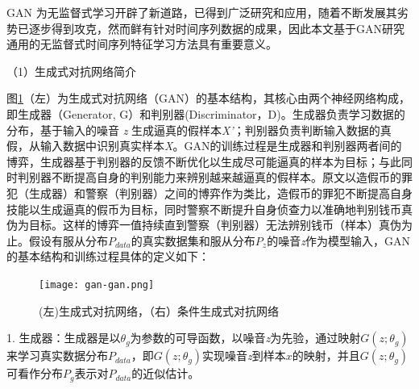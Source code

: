 GAN 为无监督式学习开辟了新道路，已得到广泛研究和应用，随着不断发展其劣势已逐步得到攻克\cite{radford2015unsupervised}，然而鲜有针对时间序列数据的成果，因此本文基于GAN研究{\heiti 通用的无监督式时间序列特征学习}方法具有重要意义。




（1）生成式对抗网络简介

图\ref{fig:gan-gan}（左）为生成式对抗网络（GAN）的基本结构，其核心由两个神经网络构成，即生成器（Generator, G）和判别器(Discriminator，D)。生成器负责学习数据的分布，基于输入的噪音 \emph{z} 生成逼真的假样本\emph{X'}；判别器负责判断输入数据的真假，从输入数据中识别真实样本\emph{X}。GAN的训练过程是生成器和判别器两者间的博弈，生成器基于判别器的反馈不断优化以生成尽可能逼真的样本为目标；与此同时判别器不断提高自身的判别能力来辨别越来越逼真的假样本。原文以造假币的罪犯（生成器）和警察（判别器）之间的博弈作为类比，造假币的罪犯不断提高自身技能以生成逼真的假币为目标，同时警察不断提升自身侦查力以准确地判别钱币真伪为目标。这样的博弈一值持续直到警察（判别器）无法辨别钱币（样本）真伪为止。假设有服从分布$P_{data}$的真实数据集和服从分布$P_{z}$的噪音\emph{z}作为模型输入，GAN的基本结构和训练过程具体的定义如下：
\begin{figure}[H]
\centering
\texttt{[image: gan-gan.png]}
\caption{(左)生成式对抗网络，（右）条件生成式对抗网络}
\label{fig:gan-gan}
\end{figure}

1. 生成器：生成器是以$\theta_{g}$为参数的可导函数，以噪音\emph{z}为先验，通过映射$G(z;\theta_{g})$来学习真实数据分布$P_{data}$，即$G(z;\theta_{g})$实现噪音\emph{z}到样本$x$的映射，并且$G(z;\theta_{g})$可看作分布$P_{g}$表示对$P_{data}$的近似估计。

